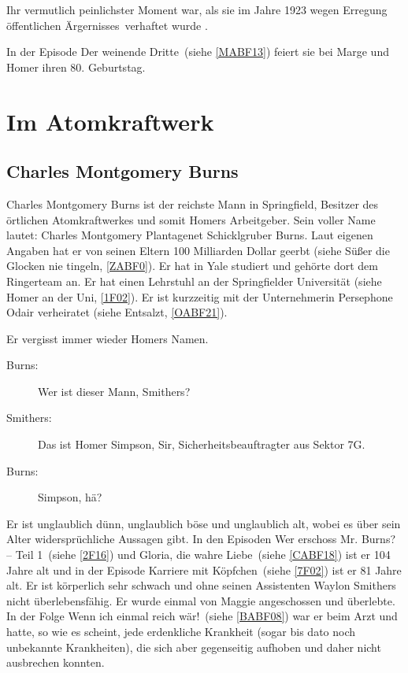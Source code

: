 Ihr vermutlich peinlichster Moment war, als sie im Jahre 1923 wegen \glqq Erregung öffentlichen Ärgernisses\grqq\ verhaftet wurde \cite{SpringfieldAt}.

In der Episode \glqq Der weinende Dritte\grqq\ (siehe \ref{MABF13}) feiert sie bei Marge und Homer ihren 80. Geburtstag.

\section{Im Atomkraftwerk}

\subsection{Charles Montgomery Burns}\label{CMBurns}
Charles Montgomery Burns ist der reichste Mann in Springfield, Besitzer des örtlichen Atomkraftwerkes und somit Homers Arbeitgeber. Sein voller Name lautet: Charles Montgomery Plantagenet Schicklgruber Burns. Laut eigenen Angaben hat er von seinen Eltern 100 Milliarden Dollar geerbt (siehe \glqq Süßer die Glocken nie tingeln\grqq, \ref{ZABF0}). Er hat in Yale studiert und gehörte dort dem Ringerteam an. Er hat einen Lehrstuhl an der Springfielder Universität (siehe \glqq Homer an der Uni\grqq, \ref{1F02}). Er ist kurzzeitig mit der Unternehmerin Persephone Odair verheiratet (siehe \glqq Entsalzt\grqq, \ref{OABF21}).

Er vergisst immer wieder Homers Namen.
\begin{description}
	\item[Burns:] \glqq Wer ist dieser Mann, Smithers?\grqq
	\item[Smithers:] \glqq Das ist Homer Simpson, Sir, Sicherheitsbeauftragter aus Sektor 7G.\grqq
	\item[Burns:] \glqq Simpson, hä?\grqq
\end{description}
Er ist unglaublich dünn, unglaublich böse und unglaublich alt, wobei es über sein Alter widersprüchliche Aussagen gibt. In den Episoden \glqq Wer erschoss Mr. Burns? -- Teil 1\grqq\ (siehe \ref{2F16}) und \glqq Gloria, die wahre Liebe\grqq\ (siehe \ref{CABF18}) ist er 104 Jahre alt und in der Episode \glqq Karriere mit Köpfchen\grqq\ (siehe \ref{7F02}) ist er 81 Jahre alt. Er ist körperlich sehr schwach und ohne seinen Assistenten Waylon Smithers nicht überlebensfähig. Er wurde einmal von Maggie angeschossen und überlebte. In der Folge \glqq Wenn ich einmal reich wär!\grqq\ (siehe \ref{BABF08}) war er beim Arzt und hatte, so wie es scheint, jede erdenkliche Krankheit (sogar bis dato noch unbekannte Krankheiten), die sich aber gegenseitig aufhoben und daher nicht ausbrechen konnten.


